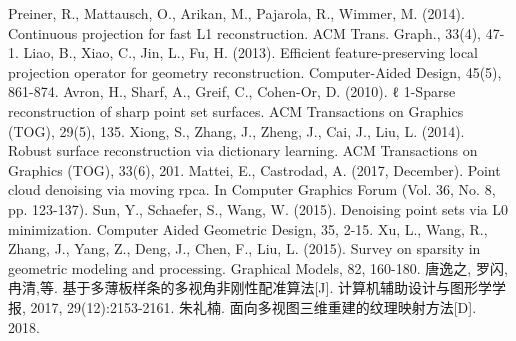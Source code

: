 \documentclass[10pt]{article}
\begin{document}
\begin{thebibliography}{1}
	Preiner, R., Mattausch, O., Arikan, M., Pajarola, R.,  Wimmer, M. (2014). Continuous projection for fast L1 reconstruction. ACM Trans. Graph., 33(4), 47-1.
	Liao, B., Xiao, C., Jin, L.,  Fu, H. (2013). Efficient feature-preserving local projection operator for geometry reconstruction. Computer-Aided Design, 45(5), 861-874.
	Avron, H., Sharf, A., Greif, C.,  Cohen-Or, D. (2010). ℓ 1-Sparse reconstruction of sharp point set surfaces. ACM Transactions on Graphics (TOG), 29(5), 135.
	Xiong, S., Zhang, J., Zheng, J., Cai, J.,  Liu, L. (2014). Robust surface reconstruction via dictionary learning. ACM Transactions on Graphics (TOG), 33(6), 201.
	Mattei, E.,  Castrodad, A. (2017, December). Point cloud denoising via moving rpca. In Computer Graphics Forum (Vol. 36, No. 8, pp. 123-137).
	Sun, Y., Schaefer, S.,  Wang, W. (2015). Denoising point sets via L0 minimization. Computer Aided Geometric Design, 35, 2-15.
	Xu, L., Wang, R., Zhang, J., Yang, Z., Deng, J., Chen, F.,  Liu, L. (2015). Survey on sparsity in geometric modeling and processing. Graphical Models, 82, 160-180.
	唐逸之, 罗闪, 冉清,等. 基于多薄板样条的多视角非刚性配准算法[J]. 计算机辅助设计与图形学学报, 2017, 29(12):2153-2161.
	朱礼楠. 面向多视图三维重建的纹理映射方法[D]. 2018.
\end{thebibliography}
\end{document}
